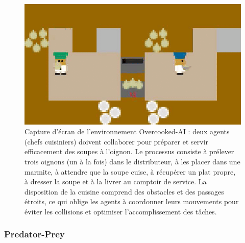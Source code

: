 \begin{figure}[h!]
  \centering
  \includegraphics[trim=0cm -0.5cm 0cm -0.5cm, clip, width=0.9\linewidth]{figures/overcooked.png}
  \caption[Capture d'écran de l'environnement Overcooked-AI]{Capture d'écran de l'environnement Overcooked-AI : deux agents (chefs cuisiniers) doivent collaborer pour préparer et servir efficacement des soupes à l'oignon. Le processus consiste à prélever trois oignons (un à la fois) dans le distributeur, à les placer dans une marmite, à attendre que la soupe cuise, à récupérer un plat propre, à dresser la soupe et à la livrer au comptoir de service. La disposition de la cuisine comprend des obstacles et des passages étroits, ce qui oblige les agents à coordonner leurs mouvements pour éviter les collisions et optimiser l'accomplissement des tâches.}
  \label{fig:overcooked}
\end{figure}

\subsubsection*{Predator-Prey}

